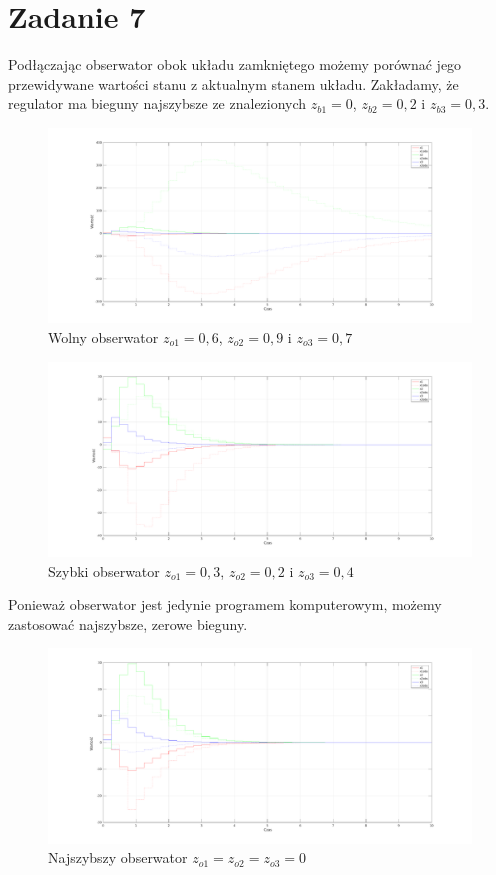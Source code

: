 \section{Zadanie 7} 
Podłączając obserwator obok układu zamkniętego możemy porównać jego przewidywane wartości stanu z aktualnym stanem układu.
Zakładamy, że regulator ma bieguny najszybsze ze znalezionych $z_{b1}=0$, $z_{b2}=0,2$ i $z_{b3}=0,3$.

\begin{figure}[H]
\centering
 \includegraphics[width=\textwidth]{img/obs1.pdf}
\caption{Wolny obserwator $z_{o1}=0,6$, $z_{o2}=0,9$ i $z_{o3}=0,7$}
\end{figure}

\begin{figure}[H]
\centering
 \includegraphics[width=\textwidth]{img/obs2.pdf}
\caption{Szybki obserwator $z_{o1}=0,3$, $z_{o2}=0,2$ i $z_{o3}=0,4$}
\end{figure}

Ponieważ obserwator jest jedynie programem komputerowym, możemy zastosować najszybsze, zerowe bieguny.

\begin{figure}[H]
\centering
 \includegraphics[width=\textwidth]{img/obs3.pdf}
\caption{Najszybszy obserwator $z_{o1}=z_{o2}=z_{o3}=0$}
\end{figure}